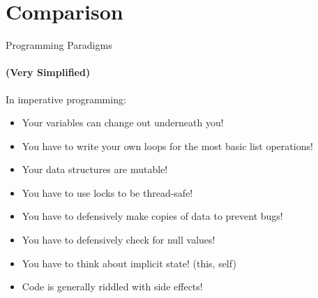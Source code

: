\documentclass[mathserif]{beamer}
\begin{document}
\section{Comparison}

\begin{frame}{Programming Paradigms}
  \framesubtitle{(Very Simplified)}
\end{frame}

\begin{frame}

  In imperative programming:

  \begin{itemize}[<+->]
  \item Your variables can change out underneath you!
  \item You have to write your own loops for the most basic list operations!
  \item Your data structures are mutable!
  \item You have to use locks to be thread-safe!
  \item You have to defensively make copies of data to prevent bugs!
  \item You have to defensively check for null values!
  \item You have to think about implicit state! (this, self)
  \item Code is generally riddled with side effects!
  \end{itemize}
\end{frame}
\end{document}

